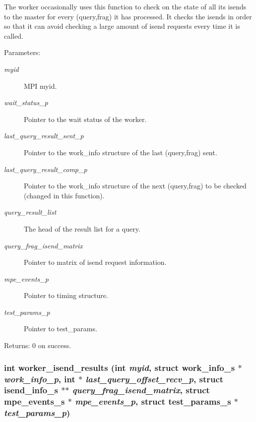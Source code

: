 The worker occasionally uses this function to check on the state of all its isends to the master for every (query,frag) it has processed. It checks the isends in order so that it can avoid checking a large amount of isend requests every time it is called.

\begin{Desc}
\item[Parameters:]
\begin{description}
\item[{\em myid}]MPI myid. \item[{\em wait\_\-status\_\-p}]Pointer to the wait status of the worker. \item[{\em last\_\-query\_\-result\_\-sent\_\-p}]Pointer to the work\_\-info structure of the last (query,frag) sent. \item[{\em last\_\-query\_\-result\_\-comp\_\-p}]Pointer to the work\_\-info structure of the next (query,frag) to be checked (changed in this function). \item[{\em query\_\-result\_\-list}]The head of the result list for a query. \item[{\em query\_\-frag\_\-isend\_\-matrix}]Pointer to matrix of isend request information. \item[{\em mpe\_\-events\_\-p}]Pointer to timing structure. \item[{\em test\_\-params\_\-p}]Pointer to test\_\-params. \end{description}
\end{Desc}
\begin{Desc}
\item[Returns:]0 on success. \end{Desc}
\subsubsection{\setlength{\rightskip}{0pt plus 5cm}int worker\_\-isend\_\-results (int {\em myid}, struct \bf{work\_\-info\_\-s} $\ast$ {\em work\_\-info\_\-p}, int $\ast$ {\em last\_\-query\_\-offset\_\-recv\_\-p}, struct \bf{isend\_\-info\_\-s} $\ast$$\ast$ {\em query\_\-frag\_\-isend\_\-matrix}, struct \bf{mpe\_\-events\_\-s} $\ast$ {\em mpe\_\-events\_\-p}, struct \bf{test\_\-params\_\-s} $\ast$ {\em test\_\-params\_\-p})}\label{worker__help_8h_592e46c30e8bc597540756ddad3517cf}


